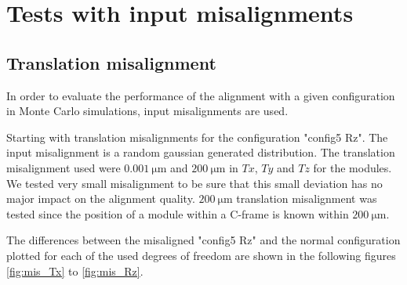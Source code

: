 \section{Tests with input misalignments}
\label{sec:misalignment}
\subsection{Translation misalignment}
\label{sec:misT}

In order to evaluate the performance of the alignment with a given configuration in Monte Carlo simulations, input misalignments are used.

Starting with translation misalignments for the configuration "config5 Rz". The input misalignment is a random gaussian generated distribution. The translation misalignment used were $\SI{0.001}{\micro\metre}$ and $\SI{200}{\micro\metre}$ in $Tx$, $Ty$ and $Tz$ for the modules. We tested very small misalignment to be sure that this small deviation has no major impact on the alignment quality. $\SI{200}{\micro\metre}$ translation misalignment was tested since the position of a module within a C-frame is known within $\SI{200}{\micro\metre}$.

The differences between the misaligned "config5 Rz" and the normal configuration plotted for each of the used degrees of freedom are shown in the following figures \ref{fig:mis_Tx} to \ref{fig:mis_Rz}.

